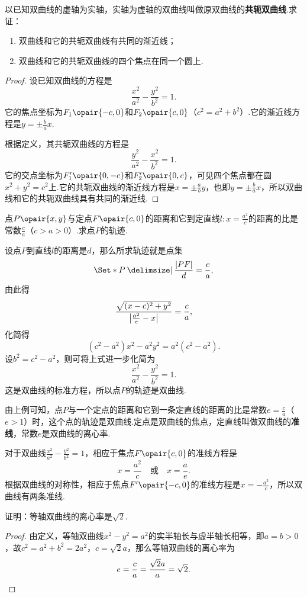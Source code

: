 \begin{example}
以已知双曲线的虚轴为实轴，实轴为虚轴的双曲线叫做原双曲线的\textbf{共轭双曲线}.求证：\begin{enumerate}
\item 双曲线和它的共轭双曲线有共同的渐近线；
\item 双曲线和它的共轭双曲线的四个焦点在同一个圆上.
\end{enumerate}
\begin{proof}
设已知双曲线的方程是\[
\frac{x^2}{a^2}-\frac{y^2}{b^2}=1.
\]它的焦点坐标为\(F_1\opair{-c,0}\)和\(F_2\opair{c,0}\)（\(c^2=a^2+b^2\)）.它的渐近线方程是\(y=\pm\frac{b}{a}x\).

根据定义，其共轭双曲线的方程是\[
\frac{y^2}{a^2}-\frac{x^2}{b^2}=1.
\]它的交点坐标为\(F'_1\opair{0,-c}\)和\(F'_2\opair{0,c}\)，可见四个焦点都在圆\(x^2+y^2=c^2\)上.它的共轭双曲线的渐近线方程是\(x=\pm\frac{a}{b}y\)，也即\(y=\pm\frac{b}{a}x\)，所以双曲线和它的共轭双曲线具有共同的渐近线.
\end{proof}
\end{example}

\begin{example}
点\(P\opair{x,y}\)与定点\(F\opair{c,0}\)的距离和它到定直线\(l: x = \frac{a^2}{c}\)的距离的比是常数\(\frac{c}{a}\)（\(c > a > 0\)）.求点\(P\)的轨迹.
\begin{solution}
设点\(P\)到直线\(l\)的距离是\(d\)，那么所求轨迹就是点集\[
\Set*{ P \given \frac{\abs{PF}}{d} = \frac{c}{a} },
\]由此得\[
\frac{\sqrt{(x-c)^2+y^2}}{\abs{\frac{a^2}{c}-x}} = \frac{c}{a},
\]化简得\[
(c^2-a^2)x^2 - a^2 y^2 = a^2(c^2-a^2).
\]设\(b^2=c^2-a^2\)，则可将上式进一步化简为\[
\frac{x^2}{a^2}-\frac{y^2}{b^2}=1.
\]这是双曲线的标准方程，所以点\(P\)的轨迹是双曲线.
\end{solution}

由上例可知，点\(P\)与一个定点的距离和它到一条定直线的距离的比是常数\(e = \frac{c}{a}\)（\(e > 1\)）时，这个点的轨迹是双曲线.定点是双曲线的焦点，定直线叫做双曲线的\textbf{准线}，常数\(e\)是双曲线的离心率.

对于双曲线\(\frac{x^2}{a^2}-\frac{y^2}{b^2}=1\)，相应于焦点\(F\opair{c,0}\)的准线方程是\[
x = \frac{a^2}{c}
\quad\text{或}\quad
x = \frac{a}{e}.
\]根据双曲线的对称性，相应于焦点\(F'\opair{-c,0}\)的准线方程是\(x=-\frac{a^2}{c}\)，所以双曲线有两条准线.
\end{example}

\begin{example}
证明：等轴双曲线的离心率是\(\sqrt2\).
\begin{proof}
由定义，等轴双曲线\(x^2-y^2=a^2\)的实半轴长与虚半轴长相等，即\(a=b>0\)，故\(c^2 = a^2 + b^2 = 2 a^2\)，\(c = \sqrt2 a\)，那么等轴双曲线的离心率为\[
e = \frac{c}{a} = \frac{\sqrt2 a}{a} = \sqrt2.
\qedhere
\]
\end{proof}
\end{example}

